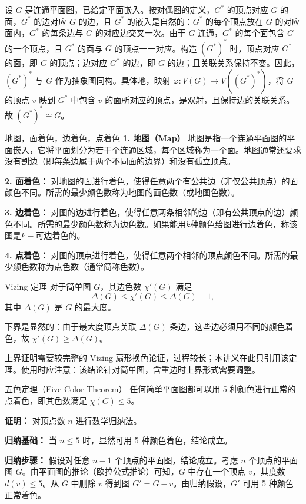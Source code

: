 \documentclass[lang=cn,11pt]{elegantbook}
\begin{document}
设 $G$ 是连通平面图，已给定平面嵌入。按对偶图的定义，$G^*$ 的顶点对应 $G$ 的面，$G^*$ 的边对应 $G$ 的边，且 $G^*$ 的嵌入是自然的：$G^*$ 的每个顶点放在 $G$ 的对应面内，$G^*$ 的每条边与 $G$ 的对应边交叉一次。由于 $G$ 连通，$G^*$ 的每个面包含 $G$ 的一个顶点，且 $G^*$ 的面与 $G$ 的顶点一一对应。构造 $(G^*)^*$ 时，顶点对应 $G^*$ 的面，即 $G$ 的顶点；边对应 $G^*$ 的边，即 $G$ 的边；且关联关系保持不变。因此，$(G^*)^*$ 与 $G$ 作为抽象图同构。具体地，映射 $\varphi: V(G) \to V((G^*)^*)$，将 $G$ 的顶点 $v$ 映到 $G^*$ 中包含 $v$ 的面所对应的顶点，是双射，且保持边的关联关系。故 $(G^*)^* \cong G$。
\begin{definition}{地图，面着色，边着色，点着色}
\textbf{1. 地图（Map）}
地图是指一个连通平面图的平面嵌入，它将平面划分为若干个连通区域，每个区域称为一个面。地图通常还要求没有割边（即每条边属于两个不同面的边界）和没有孤立顶点。

\textbf{2. 面着色：}
对地图的面进行着色，使得任意两个有公共边（非仅公共顶点）的面颜色不同。所需的最少颜色数称为地图的面色数（或地图色数）。

\textbf{3. 边着色：}
对图的边进行着色，使得任意两条相邻的边（即有公共顶点的边）颜色不同。所需的最少颜色数称为边色数。如果能用$k$种颜色给图进行边着色，称该图是$k-$可边着色的。

\textbf{4. 点着色：}
对图的顶点进行着色，使得任意两个相邻的顶点颜色不同。所需的最少颜色数称为点色数（通常简称色数）。
\end{definition}
\begin{theorem}{Vizing 定理}
    对于简单图 $G$，其边色数 $\chi'(G)$ 满足
    \[
    \Delta(G) \le \chi'(G) \le \Delta(G) + 1,
    \]
    其中 $\Delta(G)$ 是 $G$ 的最大度。
\end{theorem}
下界是显然的：由于最大度顶点关联 $\Delta(G)$ 条边，这些边必须用不同的颜色着色，故 $\chi'(G) \ge \Delta(G)$。

上界证明需要较完整的 Vizing 扇形换色论证，过程较长；本讲义在此只引用该定理。使用时应注意：该结论针对简单图，含重边时上界形式需要调整。

\begin{theorem}{五色定理（Five Color Theorem）}
    任何简单平面图都可以用 5 种颜色进行正常的点着色，即其色数满足 $\chi(G) \le 5$。
\end{theorem}
\textbf{证明：} 对顶点数 $n$ 进行数学归纳法。

    \textbf{归纳基础：} 当 $n \le 5$ 时，显然可用 5 种颜色着色，结论成立。

    \textbf{归纳步骤：} 假设对任意 $n-1$ 个顶点的平面图，结论成立。考虑 $n$ 个顶点的平面图 $G$。由平面图的推论（欧拉公式推论）可知，$G$ 中存在一个顶点 $v$，其度数 $d(v) \le 5$。从 $G$ 中删除 $v$ 得到图 $G' = G - v$。由归纳假设，$G'$ 可用 5 种颜色正常着色。
\end{document}
